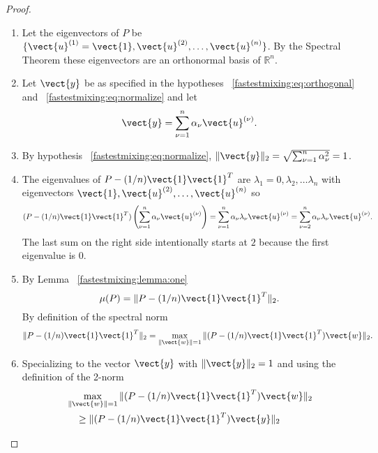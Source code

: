 \documentclass[12pt]{article}
\begin{document}
\begin{proof}
    \begin{enumerate}
        \item
            Let the eigenvectors of \( P \) be \( \{ \vect{u}^{(1)} =
            \vect{1}, \vect{u}^{(2)}, \dots , \vect{u}^{(n)} \} \).  By
            the Spectral Theorem these eigenvectors are an orthonormal
            basis of \( \mathbb{R}^n \).
        \item
            Let \( \vect{y} \) be as specified in the hypotheses~%
            \eqref{fastestmixing:eq:orthogonal} and~%
            \eqref{fastestmixing:eq:normalize} and let
            \[
                \vect{y} = \sum_{\nu=1}^{n} \alpha_\nu \vect{u}^{(\nu)}.
            \]
        \item
            By hypothesis~%
            \eqref{fastestmixing:eq:normalize}, \( \| \vect{y} \|_2 =
            \sqrt{\sum_{\nu=1}^n \alpha_\nu^2 } = 1 \).
        \item
            The eigenvalues of \( P - (1/n)\vect{1}\vect{1}^T \) are \(
            \lambda_1 = 0, \lambda_2, \dots \lambda_n \) with
            eigenvectors \( \vect{1}, \vect{u}^{%
            (2)}, \dots, \vect{u}^{(n)} \) so
            \[
                (P - (1/n)\vect{1}\vect{1}^T) \left( \sum_{\nu=1}^n
                \alpha_\nu \vect {u}^ {(\nu)} \right) = \sum_{\nu=1}^n
                \alpha_\nu \lambda_\nu \vect{u}^{(\nu)} = \sum_{\nu=2}^n
                \alpha_\nu \lambda_\nu \vect{u}^ {(\nu)}.
            \] The last sum on the right side intentionally starts at \(
            2 \) because the first eigenvalue is \( 0 \).
        \item
            By Lemma~%
            \ref{fastestmixing:lemma:one}
            \[
                \mu(P) = \| P - (1/n)\vect{1}\vect{1}^T \|_2.
            \] By definition of the spectral norm
            \[
                \| P - (1/n)\vect{1}\vect{1}^T \|_2 = \max_{\|\vect{w}
                \|=1} \| (P - (1/n)\vect{1}\vect{1}^T) \vect{w}\|_2.
            \]
        \item
            \label{fastestmixing:enum:stepsix} Specializing to the
            vector \( \vect{y} \) with \( \| \vect{y} \|_2 = 1 \) and
            using the definition of the 2-norm
            \begin{align*}
                & \max_{\|\vect{w} \|=1} \| (P - (1/n)\vect{1}\vect{1}^T)
                \vect{w}\|_2 \\
                &\quad \ge \| (P - (1/n)\vect{1}\vect{1}^T) \vect{y} \|_2

\end{align*}
\end{enumerate}
\end{proof}
\end{document}
